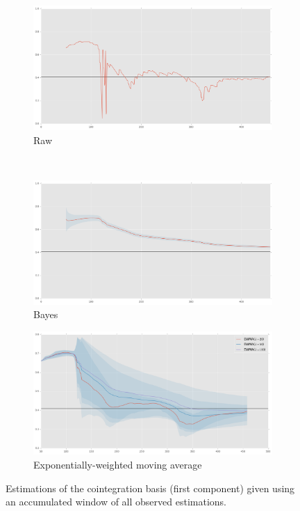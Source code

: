\begin{figure}[H]
    \begin{subfigure}[b]{1.0\textwidth}
        \centering
        \includegraphics[width=\figwidth]{img/estimation/cumulative_raw.png}

        \caption{Raw}
    \end{subfigure}
    \\[1em]
    \begin{subfigure}[b]{0.49\textwidth}
        \centering
        \includegraphics[width=\figwidth]{img/estimation/cumulative_bayes.png}

        \caption{Bayes}
    \end{subfigure}
    \hfill
    \begin{subfigure}[b]{0.49\textwidth}
        \centering
        \includegraphics[width=\figwidth]{img/estimation/cumulative_ewma.png}

        \caption{Exponentially-weighted moving average}
    \end{subfigure}

    \caption{Estimations of the cointegration basis (first component) given
    using an accumulated window of all observed
    estimations.}\label{fig:estimation:cumulative}
\end{figure}

